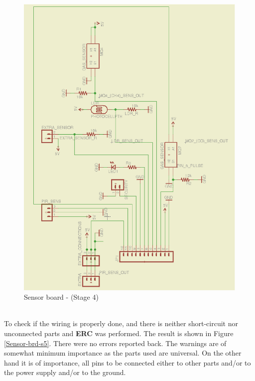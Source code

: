 \documentclass[12pt,a4paper]{report}
\begin{document}
\begin{figure}[H]
\centering
\includegraphics*[scale=0.25]{sens_brd_s4}
\caption{Sensor board -  (Stage 4)}
\label{Sensor-brd-s4} 
\end{figure}
\ \\
To check if the wiring is properly done, and there is neither short-circuit nor unconnected parts and \textbf{ERC} was performed. The result is shown in Figure \ref{Sensor-brd-s5}. There were no errors reported back. The warnings are of somewhat minimum importance as the parts used are universal. On the other hand it is of importance, all pins to be connected either to other parts and/or to the power supply and/or to the ground.
\ \\
\end{document}
